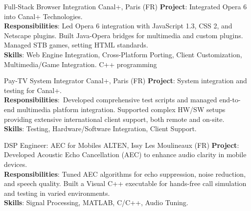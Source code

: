 \documentclass[
  a4paper,
   maincolor=cvblue,
   sectioncolor=cvblue,
]{fortysecondscv}
\begin{document}
\begin{cvtable}
    {Full-Stack Browser Integration}
    {Canal+, Paris (FR)}
    {
      \textbf{Project}: Integrated Opera 6 into Canal+ Technologies.\\
      \textbf{Responsibilities}:
          Led Opera 6 integration with JavaScript 1.3, CSS 2, and Netscape plugins. Built Java-Opera bridges for multimedia and custom plugins. Managed STB games, setting HTML standards.\\
      \textbf{Skills}: Web Engine Integration, Cross-Platform Porting, Client Customization, Multimedia/Game Integration. C++ programming\\
    }

    {Pay-TV System Integrator}
    {Canal+,  Paris (FR)}
    {
      \textbf{Project}: System integration and testing for Canal+.\\
      \textbf{Responsibilities}:\
          Developed comprehensive test scripts and managed end-to-end multimedia platform integration.
          Supported complex HW/SW setups providing extensive international client support, both remote and on-site.\\
      \textbf{Skills}: Testing, Hardware/Software Integration, Client Support.\\
    }

    {DSP Engineer: AEC for Mobiles}
    {ALTEN, Issy Les Moulineaux (FR)}
    {
      \textbf{Project}: Developed Acoustic Echo Cancellation (AEC) to enhance audio clarity in mobile devices.\\
      \textbf{Responsibilities}:
          Tuned AEC algorithms for echo suppression, noise reduction, and speech quality. Built a Visual C++ executable for hands-free call simulation and testing in varied environments.\\
      \textbf{Skills}: Signal Processing, MATLAB, C/C++, Audio Tuning.
    }
\end{cvtable}
\end{document}
